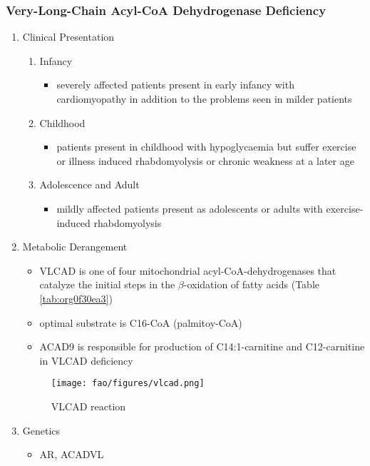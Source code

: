 \documentclass{scrartcl}
\begin{document}
\subsubsection{Very-Long-Chain Acyl-CoA Dehydrogenase Deficiency}
\label{sec:org334dfb5}
\begin{enumerate}
\item Clinical Presentation
\label{sec:orgd65d427}
\begin{enumerate}
\item Infancy
\label{sec:org4bc01c5}
\begin{itemize}
\item severely affected patients present in early infancy with
cardiomyopathy in addition to the problems seen in milder patients
\end{itemize}
\item Childhood
\label{sec:orgcdf853c}
\begin{itemize}
\item patients present in childhood with hypoglycaemia but suffer exercise
or illness induced rhabdomyolysis or chronic weakness at a later age
\end{itemize}
\item Adolescence and Adult
\label{sec:orga4bfd11}
\begin{itemize}
\item mildly affected patients present as adolescents or adults with
exercise-induced rhabdomyolysis
\end{itemize}
\end{enumerate}
\item Metabolic Derangement
\label{sec:org5e29b4c}
\begin{itemize}
\item VLCAD is one of four mitochondrial acyl-CoA-dehydrogenases that
catalyze the initial steps in the \(\beta\)-oxidation of fatty acids
(Table \ref{tab:org0f30ea3})
\item optimal substrate is C16-CoA (palmitoy-CoA)
\item ACAD9 is responsible for production of C14:1-carnitine and
C12-carnitine in VLCAD deficiency
\end{itemize}
\begin{figure}[htbp]
\centering
\texttt{[image: fao/figures/vlcad.png]}
\caption{\label{fig:orga0f6c0a}VLCAD reaction}
\end{figure}

\item Genetics
\label{sec:orgb6b8229}
\begin{itemize}
\item AR, ACADVL
\end{itemize}


\end{enumerate}
\end{document}
